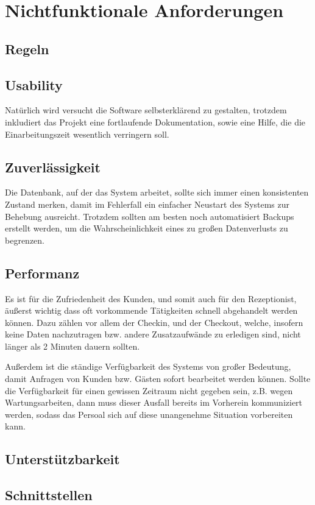 \documentclass[10pt,a4paper,titlepage]{article}
\begin{document}
\section{Nichtfunktionale Anforderungen}
\subsection{Regeln}
\subsection{Usability}
Natürlich wird versucht die Software selbsterklärend zu gestalten, trotzdem inkludiert das Projekt eine fortlaufende Dokumentation, sowie eine Hilfe, die die Einarbeitungszeit wesentlich verringern soll.
\subsection{Zuverlässigkeit}
Die Datenbank, auf der das System arbeitet, sollte sich immer einen konsistenten Zustand merken, damit im Fehlerfall ein einfacher Neustart des Systems zur Behebung ausreicht. Trotzdem sollten am besten noch automatisiert Backups erstellt werden, um die Wahrscheinlichkeit eines zu großen Datenverlusts zu begrenzen.
\subsection{Performanz}
Es ist für die Zufriedenheit des Kunden, und somit auch für den \Gls{Rezeptionist}, äußerst wichtig dass oft vorkommende Tätigkeiten schnell abgehandelt werden können. Dazu zählen vor allem der \Gls{Checkin}, und der \Gls{Checkout}, welche, insofern keine Daten nachzutragen bzw. andere Zusatzaufwände zu erledigen sind, nicht länger als 2 Minuten dauern sollten.

Außerdem ist die ständige Verfügbarkeit des Systems von großer Bedeutung, damit Anfragen von Kunden bzw. Gästen sofort bearbeitet werden können. Sollte die Verfügbarkeit für einen gewissen Zeitraum nicht gegeben sein, z.B. wegen Wartungsarbeiten, dann muss dieser Ausfall bereits im Vorherein kommuniziert werden, sodass das Persoal sich auf diese unangenehme Situation vorbereiten kann.
\subsection{Unterstützbarkeit}
\subsection{Schnittstellen}
\end{document}
